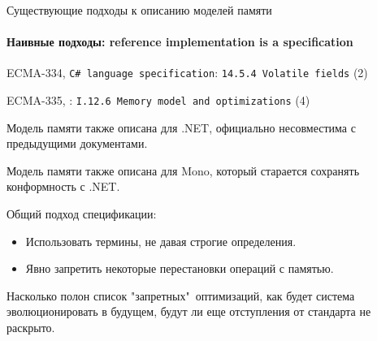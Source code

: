 \begin{frame}[t,noframenumbering]{Существующие подходы к описанию моделей памяти}
\framesubtitle{Наивные подходы: reference implementation is a specification}

{\small
ECMA-334, \texttt{C\# language specification}: \texttt{14.5.4 Volatile fields} (2)
}

{\small
ECMA-335, : \texttt{I.12.6 Memory model and optimizations} (4)
}

Модель памяти также описана для .NET, официально несовместима с предыдущими документами.

Модель памяти также описана для Mono, который старается сохранять конформность с .NET.

\pause
Общий подход спецификации:
\begin{itemize}
	\pause
	\item {}
	\pause
	Использовать термины, не давая строгие определения.

	\pause
	\item Явно запретить некоторые перестановки операций с памятью.
\end{itemize}

\pause
Насколько полон список "запретных"\ оптимизаций, как будет система эволюционировать в будущем, будут ли еще отступления от стандарта не раскрыто.

\end{frame}

